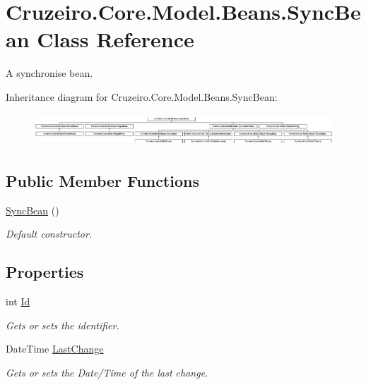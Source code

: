 \hypertarget{class_cruzeiro_1_1_core_1_1_model_1_1_beans_1_1_sync_bean}{}\section{Cruzeiro.\+Core.\+Model.\+Beans.\+Sync\+Bean Class Reference}
\label{class_cruzeiro_1_1_core_1_1_model_1_1_beans_1_1_sync_bean}


A synchronise bean.  


Inheritance diagram for Cruzeiro.\+Core.\+Model.\+Beans.\+Sync\+Bean\+:\begin{figure}[H]
\begin{center}
\leavevmode
\includegraphics[height=1.232123cm]{class_cruzeiro_1_1_core_1_1_model_1_1_beans_1_1_sync_bean}
\end{center}
\end{figure}
\subsection*{Public Member Functions}
\begin{DoxyCompactItemize}
\item 
\hyperlink{class_cruzeiro_1_1_core_1_1_model_1_1_beans_1_1_sync_bean_a1f5d9dc647905fa191a619e2ea22a5a6}{Sync\+Bean} ()
\begin{DoxyCompactList}\small\item\em Default constructor. \end{DoxyCompactList}\end{DoxyCompactItemize}
\subsection*{Properties}
\begin{DoxyCompactItemize}
\item 
int \hyperlink{class_cruzeiro_1_1_core_1_1_model_1_1_beans_1_1_sync_bean_a880033435ed928ef926836209dc38b7d}{Id}
\begin{DoxyCompactList}\small\item\em Gets or sets the identifier. \end{DoxyCompactList}\item 
Date\+Time \hyperlink{class_cruzeiro_1_1_core_1_1_model_1_1_beans_1_1_sync_bean_afce6edbbdd5121f288c7f3274882e3e6}{Last\+Change}
\begin{DoxyCompactList}\small\item\em Gets or sets the Date/\+Time of the last change. \end{DoxyCompactList}\end{DoxyCompactItemize}


